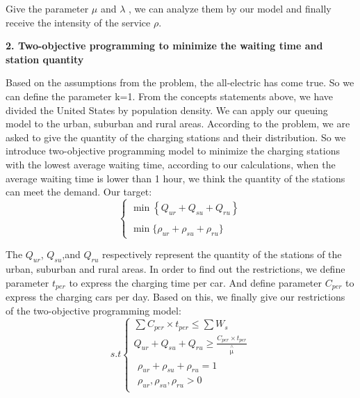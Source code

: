 \documentclass[12pt]{article}  %
\begin{document}
Give the parameter $\mu $ and $\lambda $ , we can analyze them by our model and finally receive the intensity of the service $\rho $.

\textbf{2. Two-objective programming to minimize the waiting time and station quantity}

Based on the assumptions from the problem, the all-electric has come true. So we can define the parameter k=1. From the concepts statements above, we have divided the United States by population density. We can apply our queuing model to the urban, suburban and rural areas. According to the problem, we are asked to give the quantity of the charging stations and their distribution. So we introduce two-objective programming model to minimize the charging stations with the lowest average waiting time, according to our calculations, when the average waiting time is lower than 1 hour, we think the quantity of the stations can meet the demand. 
Our target: 
\begin{equation}\label{eq:tar}
\left\{ {\begin{array}{*{20}{c}}
	{\min \left\{ {{Q_{ur}} + {Q_{su}} + {Q_{ru}}} \right\}}\\
	{}\\
	{\min \{ {\rho _{ur}} + {\rho _{su}} + {\rho _{ru}}\} }
	\end{array}} \right.
\end{equation}

The ${Q_{ur}}$, ${Q_{su}}$,and ${Q_{ru}}$ respectively represent the quantity of the stations of the urban, suburban and rural areas.
In order to find out the restrictions, we define parameter ${t_{per}}$ to express the charging time per car. And define parameter ${C_{per}}$ to express the charging cars per day. Based on this, we finally give our restrictions of the two-objective programming model:
\begin{equation}\label{eq:restrict}
s.t\left\{ {\begin{array}{*{20}{c}}
	{\sum {{C_{per}}}  \times {t_{per}} \le \sum {{W_s}} }\\
	{{Q_{ur}} + {Q_{su}} + {Q_{ru}} \ge \frac{{{C_{per}} \times {t_{per}}}}{{\mathop \mu \limits^ \wedge  }}}\\
	\begin{array}{l}
	{\rho _{ur}} + {\rho _{su}} + {\rho _{ru}} = 1\\
	{\rho _{ur}},{\rho _{su}},{\rho _{ru}} > 0
	\end{array}
	\end{array}} \right.
\end{equation}
\end{document}
